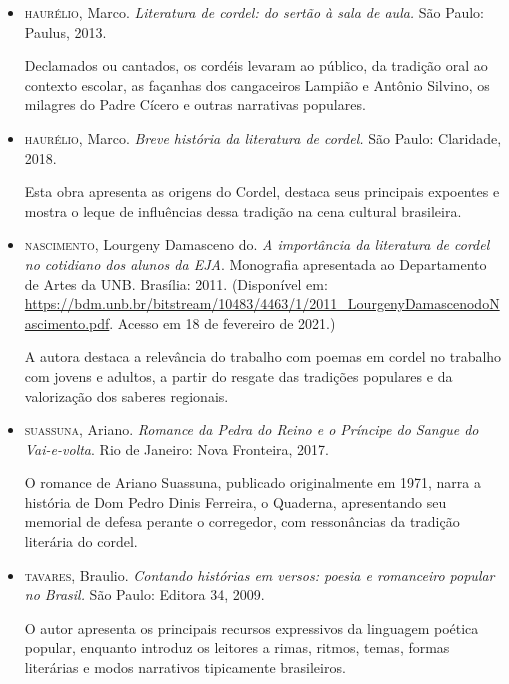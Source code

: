 \documentclass[12pt]{extarticle}
\begin{document}
\begin{itemize}
\item \textsc{haurélio}, Marco. \textit{Literatura de cordel: do sertão à sala
  de aula.} São Paulo: Paulus, 2013.

Declamados ou cantados, os cordéis levaram ao público, da tradição oral ao
contexto escolar, as façanhas dos cangaceiros Lampião e Antônio Silvino, os
milagres do Padre Cícero e outras narrativas populares.

\item \textsc{haurélio}, Marco. \textit{Breve história da literatura de
  cordel.} São Paulo: Claridade, 2018.

Esta obra apresenta as origens do Cordel, destaca seus principais expoentes
e mostra o leque de influências dessa tradição na cena cultural brasileira.

\item \textsc{nascimento}, Lourgeny Damasceno do. \textit{A importância da
  literatura de cordel no cotidiano dos alunos da EJA}. Monografia apresentada
  ao Departamento de Artes da UNB. Brasília: 2011. (Disponível em:
  \url{https://bdm.unb.br/bitstream/10483/4463/1/2011_LourgenyDamascenodoNascimento.pdf}.
  Acesso em 18 de fevereiro de 2021.)

A autora destaca a relevância do trabalho com poemas em cordel no trabalho com
jovens e adultos, a partir do resgate das tradições populares e da valorização
dos saberes regionais.

\item \textsc{suassuna}, Ariano. \textit{Romance da Pedra do Reino e o Príncipe
  do Sangue do Vai-e-volta}. Rio de Janeiro: Nova Fronteira, 2017.

O romance de Ariano Suassuna, publicado originalmente em 1971, narra a história
de Dom Pedro Dinis Ferreira, o Quaderna, apresentando seu memorial de defesa
perante o corregedor, com ressonâncias da tradição literária do cordel.

\item \textsc{tavares}, Braulio. \textit{Contando histórias em versos: poesia
  e romanceiro popular no Brasil.} São Paulo: Editora 34, 2009.

O autor apresenta os principais recursos expressivos da linguagem poética
popular, enquanto introduz os leitores a rimas, ritmos, temas, formas
literárias e modos narrativos tipicamente brasileiros.

\end{itemize}
\end{document}
